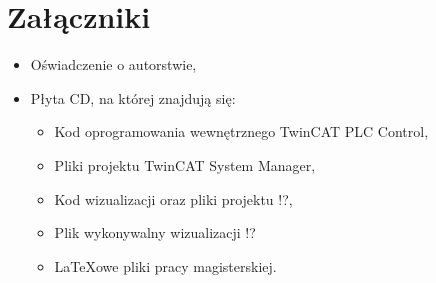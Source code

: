 \section{Załączniki}
\begin{itemize}
\item Oświadczenie o autorstwie,
\item Płyta CD, na której znajdują się:
\begin{itemize}
\item Kod oprogramowania wewnętrznego TwinCAT PLC Control,
\item Pliki projektu TwinCAT System Manager,
\item Kod wizualizacji oraz pliki projektu !?,
\item Plik wykonywalny wizualizacji !?
\item LaTeXowe pliki pracy magisterskiej.
\end{itemize}
\end{itemize}
